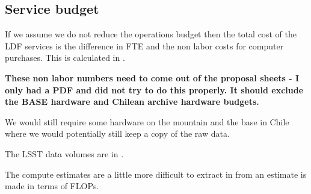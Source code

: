 \subsection{Service budget}

If we assume we do not reduce the operations budget then the total cost of the \gls{LDF} services is
the difference in \gls{FTE} and the non labor costs for computer purchases.
This is calculated in  .



\textbf{ These non labor numbers need to come out of the proposal sheets - I only had a \gls{PDF} and did not try to do this properly. It should exclude the BASE hardware and Chilean archive hardware budgets.}


We would still require some hardware on the mountain and the base in Chile where we would potentially still keep a copy of the raw data.


The  \gls{LSST} data volumes are in  .





The compute estimates are a little more difficult to extract in  from 
an estimate is made in terms of FLOPs.


